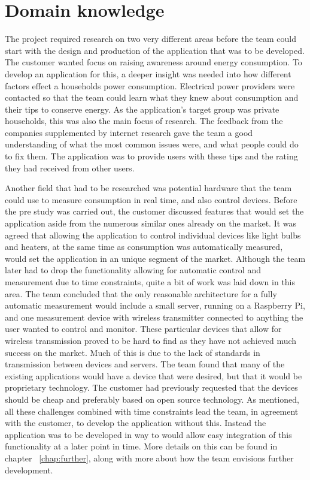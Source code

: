 \section{Domain knowledge}
The project required research on two very different areas before the team could start with the design and production of the application that was to be developed. The customer wanted focus on raising awareness around energy consumption. To develop an application for this, a deeper insight was needed into how different factors effect a households  power consumption. Electrical power providers were contacted so that the team could learn what they knew about consumption and their tips to conserve energy. As the application's target group was private households, this was also the main focus of research. The feedback from the companies supplemented by internet research gave the team a good understanding of what the most common issues were, and what people could do to fix them. The application was to provide users with these tips and the rating they had received from other users. 

Another field that had to be researched was potential hardware that the team could use to measure consumption in real time, and also control devices. Before the pre study was carried out, the customer discussed features that would set the application aside from the numerous similar ones already on the market. It was agreed that allowing the application to control individual devices like light bulbs and heaters, at the same time as consumption was automatically measured, would set the application in an unique segment of the market. Although the team later had to drop the functionality allowing for automatic control and measurement due to time constraints, quite a bit of work was laid down in this area. The team concluded that the only reasonable architecture for a fully automatic measurement would include a small server, running on a Raspberry Pi, and one measurement device with wireless transmitter connected to anything the user wanted to control and monitor. These particular devices that allow for wireless transmission proved to be hard to find as they have not achieved much success on the market. Much of this is due to the lack of standards in transmission between devices and servers. The team found that many of the existing applications would have a device that were desired, but that it would be proprietary technology. The customer had previously requested that the devices should be cheap and preferably based on open source technology. As mentioned, all these challenges combined with time constraints lead the team, in agreement with the customer, to develop the application without  this. Instead the application was to be developed in way to would allow easy integration of this functionality at a later point in time. More details on this can be found in chapter ~\ref{chap:further}, along with more about how the team envisions further development. 